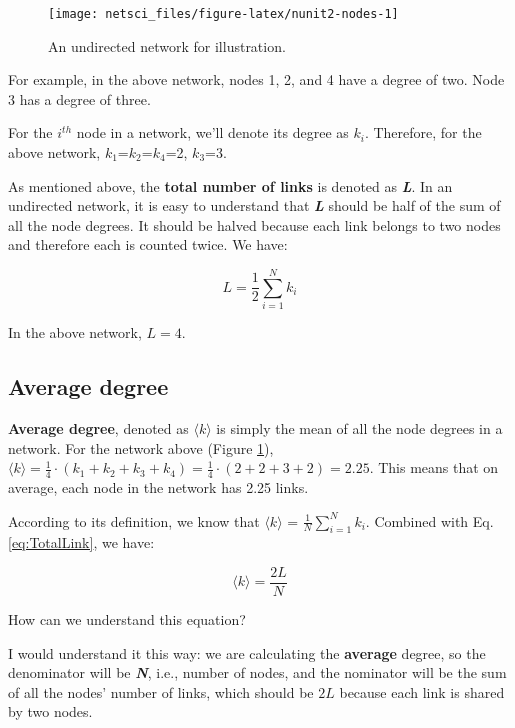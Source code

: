 \documentclass[
]{krantz}
\begin{document}
\begin{figure}

{\centering \texttt{[image: netsci\_files/figure-latex/nunit2-nodes-1]} 

}

\caption{An undirected network for illustration.}\label{fig:nunit2-nodes}
\end{figure}

For example, in the above network, nodes 1, 2, and 4 have a degree of two. Node 3 has a degree of three.

For the \(i^{th}\) node in a network, we'll denote its degree as \(k_i\). Therefore, for the above network, \(k_1\)=\(k_2\)=\(k_4\)=2, \(k_3\)=3.

As mentioned above, the \textbf{total number of links} is denoted as \textbf{\emph{L}}. In an undirected network, it is easy to understand that \textbf{\emph{L}} should be half of the sum of all the node degrees. It should be halved because each link belongs to two nodes and therefore each is counted twice. We have:

\begin{equation} 
  L = \frac{1}{2} \sum_{i=1}^N k_i \label{eq:TotalLink}
\end{equation}

In the above network, \(L = 4\).

\hypertarget{average-degree}{%
\subsection{Average degree}\label{average-degree}}

\textbf{Average degree}, denoted as \(\langle k \rangle\) is simply the mean of all the node degrees in a network. For the network above (Figure \ref{fig:nunit2-nodes}), \(\langle k \rangle = \frac{1}{4} \cdot (k_1 + k_2 + k_3 + k_4) = \frac{1}{4} \cdot (2+2+3+2) = 2.25\). This means that on average, each node in the network has 2.25 links.

According to its definition, we know that \(\langle k \rangle\) = \(\frac{1}{N} \sum_{i=1}^N k_i\). Combined with Eq. \eqref{eq:TotalLink}, we have:

\begin{equation} 
  \langle k \rangle = \frac{2L}{N} \label{eq:AverageDegree}
\end{equation}

How can we understand this equation?

I would understand it this way: we are calculating the \textbf{average} degree, so the denominator will be \textbf{\emph{N}}, i.e., number of nodes, and the nominator will be the sum of all the nodes' number of links, which should be \(2L\) because each link is shared by two nodes.
\end{document}
